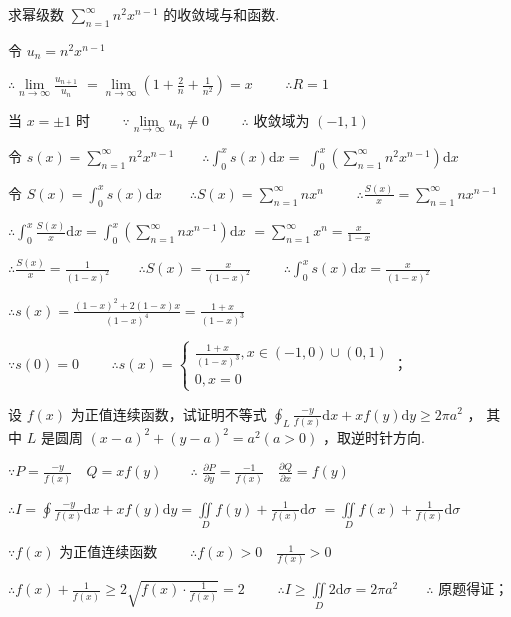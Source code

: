 \begin{problem}[points = 7]
求幂级数 $\sum\limits_{n = 1}^{\infty} n^2x^{n - 1}$ 的收敛域与和函数.
\end{problem}
\begin{solution}
    令 $u_n = n^2x^{n - 1}$

    $\therefore \lim\limits_{n \to \infty} \frac{u_{n + 1}}{u_n}$
    $= \lim\limits_{n \to \infty} \left(1 + \frac{2}{n} + \frac{1}{n^2}\right) = x \qquad$
    $\therefore R = 1$

    当 $x = \pm 1$ 时 $\qquad\because \lim\limits_{n \to \infty} u_n \neq 0 \qquad$
    $\therefore$ 收敛域为 $(-1, 1)$

    令 $s(x) = \sum\limits_{n = 1}^{\infty} n^2x^{n - 1} \qquad \therefore \int_0^x s(x)\mathrm{d}x =$
    $\int_0^x \left(\sum\limits_{n = 1}^{\infty} n^2x^{n - 1}\right)\mathrm{d}x$

    令 $S(x) = \int_0^x s(x)\mathrm{d}x \qquad \therefore S(x) = \sum\limits_{n = 1}^{\infty} nx^n \qquad$
    $\therefore \frac{S(x)}{x} = \sum\limits_{n = 1}^{\infty} nx^{n - 1}$

    $\therefore \int_0^x \frac{S(x)}{x}\mathrm{d}x = \int_0^x \left(\sum\limits_{n = 1}^{\infty} nx^{n - 1}\right)\mathrm{d}x$
    $= \sum\limits_{n = 1}^{\infty} x^n = \frac{x}{1 - x}$

    $\therefore \frac{S(x)}{x} = \frac{1}{(1 - x)^2} \qquad \therefore S(x) = \frac{x}{(1 - x)^2} \qquad$
    $\therefore \int_0^x s(x)\mathrm{d}x = \frac{x}{(1 - x)^2}$

    $\therefore s(x) = \frac{(1 - x)^ 2 + 2(1 - x)x}{(1 - x)^4} = \frac{1 + x}{(1 - x)^3}$

    $\because s(0) = 0 \qquad$
    $\therefore s(x) = \begin{cases}
            \frac{1 + x}{(1 - x)^3}, x \in (-1, 0) \cup (0, 1) \\
            0, x = 0
        \end{cases}$；
\end{solution}

\begin{problem}[points = 5]
设 $f(x)$ 为正值连续函数，试证明不等式 $\oint_L \frac{-y}{f(x)}\mathrm{d}x + xf(y)\mathrm{d}y \geq 2\pi a^2$ ，
其中 $L$ 是圆周 $(x - a)^2 + (y - a)^2 = a^2 (a > 0)$ ，取逆时针方向.
\end{problem}
\begin{solution}
    $\because P = \frac{-y}{f(x)} \quad Q = xf(y) \qquad \therefore$
    $\frac{\partial P}{\partial y} = \frac{-1}{f(x)} \quad \frac{\partial Q}{\partial x} = f(y)$

    $\therefore I = \oint \frac{-y}{f(x)}\mathrm{d}x + xf(y)\mathrm{d}y = \iint\limits_D f(y) + \frac{1}{f(x)} \mathrm{d}\sigma$
    $= \iint\limits_D f(x) + \frac{1}{f(x)} \mathrm{d}\sigma$

    $\because f(x)$ 为正值连续函数 $\qquad \therefore f(x) > 0 \quad \frac{1}{f(x)} > 0$

    $\therefore f(x) + \frac{1}{f(x)} \geq 2\sqrt{f(x) \cdot \frac{1}{f(x)}} = 2 \qquad$
    $\therefore I \geq \iint\limits_D 2\mathrm{d}\sigma = 2\pi a^2 \qquad \therefore$ 原题得证；
\end{solution}
